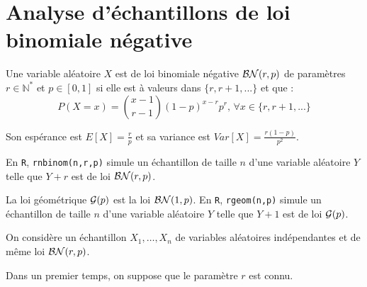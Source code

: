 \documentclass[12pt]{article}
\newcommand{\dsp}{\displaystyle}
\begin{document}
\section{Analyse d'échantillons de loi binomiale négative}

Une variable aléatoire $X$ est de loi binomiale négative ${\cal BN}(r,p)$ de paramètres $r \in \mathbb{N}^*$ et $p \in [0, 1]$  si elle est à valeurs dans $ \{r, r+1, ...\}$ et que :
$$P(X=x) = \binom{x-1}{r-1}(1-p)^{x-r}p^r, \, \forall x \in \{r, r+1, ...\}$$

Son espérance est $E[X]={\dsp \frac{r}{p}}$ et sa variance est $Var[X]={\dsp \frac{r(1-p)}{p^2}}$.

En {\tt R}, {\tt rnbinom(n,r,p)} simule un échantillon de taille $n$ d'une variable aléatoire $Y$ telle que $Y+r$ est de loi ${\cal BN}(r,p)$.

La loi géométrique ${\cal G}(p)$ est la loi ${\cal BN}(1,p)$. En {\tt R}, {\tt rgeom(n,p)} simule un échantillon de taille $n$ d'une variable aléatoire $Y$ telle que $Y+1$ est de loi ${\cal G}(p)$.

On considère un échantillon $X_1, \ldots, X_n$ de variables aléatoires indépendantes et de même loi ${\cal BN}(r,p)$.

Dans un premier temps, on suppose que le paramètre $r$ est connu.

\vspace{3mm}
\end{document}

